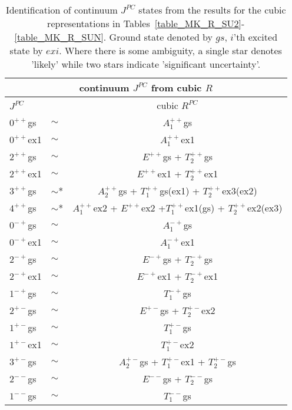 \documentclass[12pt]{article}
\begin{document}
\begin{table}[htb]
\centering
\begin{tabular}{|llc|} \hline
\multicolumn{3}{|c|}{continuum $J^{PC}$ from cubic $R$} \\ \hline
$J^{PC}$    &        &  cubic $R^{PC}$  \\  \hline
$0^{++}$gs  & $\sim$ & $A_1^{++}$gs     \\ 
$0^{++}$ex1 & $\sim$ & $A_1^{++}$ex1    \\ 
$2^{++}$gs  & $\sim$ & $E^{++}$gs + $T_2^{++}$gs    \\  
$2^{++}$ex1 & $\sim$ & $E^{++}$ex1 + $T_2^{++}$ex1    \\ 
$3^{++}$gs  & $\sim$* & $A_2^{++}$gs + $T_1^{++}$gs(ex1) + $T_2^{++}$ex3(ex2)    \\ 
$4^{++}$gs  & $\sim$* & $A_1^{++}$ex2 + $E^{++}$ex2 +$T_1^{++}$ex1(gs) + $T_2^{++}$ex2(ex3)   \\ \hline
 $0^{-+}$gs  &  $\sim$  &  $A_1^{-+}$gs     \\ 
 $0^{-+}$ex1 &  $\sim$  &  $A_1^{-+}$ex1    \\
 $2^{-+}$gs  &  $\sim$  &  $E^{-+}$gs + $T_2^{-+}$gs   \\
 $2^{-+}$ex1 &  $\sim$  &  $E^{-+}$ex1 + $T_2^{-+}$ex1   \\ 
 $1^{-+}$gs  &  $\sim$  & $T_1^{-+}$gs    \\ \hline
 $2^{+-}$gs  &  $\sim$  &  $E^{+-}$gs + $T_2^{+-}$ex2   \\
 $1^{+-}$gs  &  $\sim$  & $T_1^{+-}$gs   \\ 
 $1^{+-}$ex1 &  $\sim$  & $T_1^{+-}$ex2   \\ 
 $3^{+-}$gs  &  $\sim$  & $A_2^{+-}$gs + $T_1^{+-}$ex1 + $T_2^{+-}$gs   \\  \hline
 $2^{--}$gs  &  $\sim$  & $E^{--}$gs + $T_2^{--}$gs \\
 $1^{--}$gs  &  $\sim$  & $T_1^{--}$gs   \\ \hline
\end{tabular}
\caption{Identification of continuum $J^{PC}$ states from the results for the cubic representations
  in  Tables~\ref{table_MK_R_SU2}-\ref{table_MK_R_SUN}.
  Ground state denoted by $gs$, $i$'th excited state by $exi$. Where
  there is some ambiguity, a single star denotes 'likely'
  while two stars indicate 'significant uncertainty'.}
\label{table_M_J_R}
\end{table}
\end{document}

